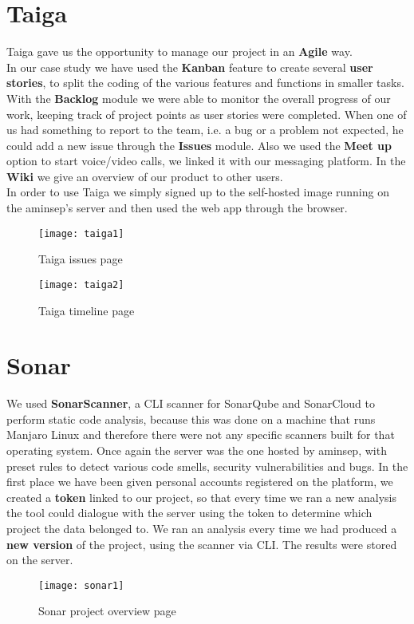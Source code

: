 \documentclass[a4paper,10pt]{report}
\begin{document}
\section[Taiga]{Taiga} %
Taiga gave us the opportunity to manage our project in an \textbf{Agile} way. \\
In our case study we have used the \textbf{Kanban} feature to create several \textbf{user stories}, to split the coding of the various features and functions in smaller tasks. With the \textbf{Backlog} module we were able to monitor the overall progress of our work, keeping track of project points as user stories were completed. When one of us had something to report to the team, i.e. a bug or a problem not expected, he could add a new issue through the \textbf{Issues} module.
Also we used the \textbf{Meet up} option to start voice/video calls, we linked it with our messaging platform.
In the \textbf{Wiki} we give an overview of our product to other users.\\
In order to use Taiga we simply signed up to the self-hosted image running on the aminsep's server and then used the web app through the browser.
\begin{figure}[H]
	\centering
    \texttt{[image: taiga1]}
    \caption{Taiga issues page}
    \label{fig:taiga1}
\end{figure}
\begin{figure}[H]
	\centering
    \texttt{[image: taiga2]}
    \caption{Taiga timeline page}
    \label{fig:taiga2}
\end{figure}
\section{Sonar}
We used \textbf{SonarScanner}, a CLI scanner for SonarQube and SonarCloud to perform static code analysis, because this was done on a machine that runs Manjaro Linux and therefore there were not any specific scanners built for that operating system. Once again the server was the one hosted by aminsep, with preset rules to detect various code smells, security vulnerabilities and bugs. 
In the first place we have been given personal accounts registered on the platform, we created a \textbf{token} linked to our project, so that every time we ran a new analysis the tool could dialogue with the server using the token to determine which project the data belonged to.
We ran an analysis every time we had produced a \textbf{new version} of the project, using the scanner via CLI. The results were stored on the server.
\begin{figure}[H]
	\centering
    \texttt{[image: sonar1]}
    \caption{Sonar project overview page}
    \label{fig:sonar1}
\end{figure}
\end{document}
